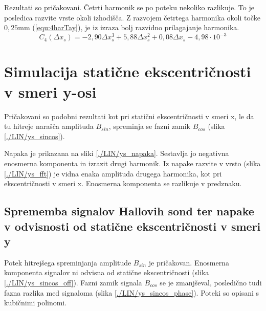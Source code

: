 Rezultati so pričakovani.
Četrti harmonik se po poteku nekoliko razlikuje. To je posledica razvite vrste okoli izhodišča. Z razvojem četrtega harmonika okoli točke $0,25 \mathrm{ mm}$ (\ref{equ:4harTay}), je iz izraza bolj razvidno prilagajanje harmonika.
\begin{equation}
\label{equ:4harTay}
C_4(\Delta x_s) =-2,90\Delta x_s^{3}+5,88\Delta x_s^{2}+0,08 \Delta x_s - 4,98 \cdot 10^{-3}
\end{equation}


\section{Simulacija statične ekscentričnosti v smeri y-osi}

Pričakovani so podobni rezultati kot pri statični ekscentričnosti v smeri x, le da tu hitreje narašča amplituda $B_{sin}$, spreminja se fazni zamik $B_{cos}$ (slika \ref{./LIN/ys_sincos}).
 

Napaka je prikazana na sliki \ref{./LIN/ys_napaka}. Sestavlja jo negativna enosmerna komponenta in izrazit drugi harmonik. Iz napake razvite v vrsto (slika \ref{./LIN/ys_fft}) je vidna enaka amplituda drugega harmonika, kot pri ekscentričnosti v smeri x. Enosmerna komponenta se razlikuje v predznaku.
\newpage
\subsection{Sprememba signalov Hallovih sond ter napake v odvisnosti od statične ekscentričnosti v smeri y}

Potek hitrejšega spreminjanja amplitude $B_{sin}$ je pričakovan. Enosmerna komponenta signalov ni odvisna od statične ekscentričnosti (slika \ref{./LIN/ys_sincos_off}). Fazni zamik signala $B_{cos}$ se je zmanjševal, posledično tudi fazna razlika med signaloma (slika \ref{./LIN/ys_sincos_phase}). Poteki so opisani s kubičnimi polinomi.

